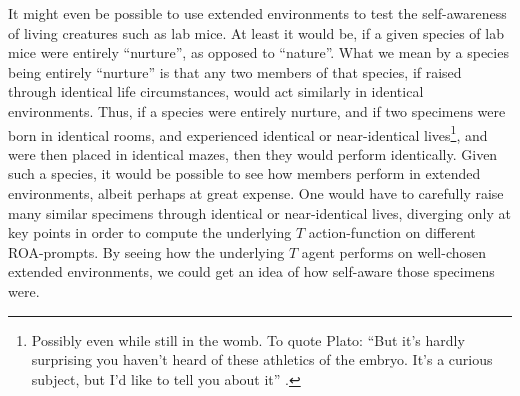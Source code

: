 \documentclass[runningheads]{llncs}
\begin{document}
It might even be possible to use extended environments to test the self-awareness
of living creatures such as lab mice. At least it would be, if a given species of
lab mice were entirely ``nurture'', as opposed to ``nature''. What we mean by a
species being entirely ``nurture'' is that any two members of that species,
if raised through identical life circumstances, would act similarly in identical environments.
Thus, if a species were entirely nurture, and if two specimens were born in identical
rooms, and experienced identical or near-identical lives\footnote{Possibly even
while still in the womb. To quote Plato: ``But it's hardly surprising you haven't
heard of these athletics of the embryo. It's a curious subject, but I'd like to
tell you about it'' \cite{platolaws}.},
and were then placed in identical mazes, then they would perform identically.
Given such a species, it would be possible to see how members perform in extended
environments, albeit perhaps at great expense. One would have to carefully raise many
similar specimens through identical or near-identical lives, diverging only at key
points in order to compute the underlying $T$ action-function on different ROA-prompts.
By seeing how the underlying $T$ agent performs on well-chosen extended environments,
we could get an idea of how self-aware those specimens were.




\end{document}
